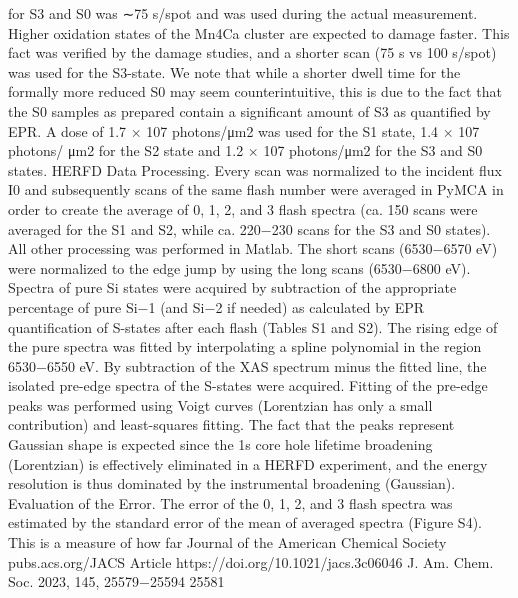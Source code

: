 \documentclass{article}
\begin{document}
for S3 and S0 was ∼75 s/spot and was used during the actual
measurement. Higher oxidation states of the Mn4Ca cluster are
expected to damage faster. This fact was verified by the damage
studies, and a shorter scan (75 s vs 100 s/spot) was used for
the S3-state. We note that while a shorter dwell time for the
formally more reduced S0 may seem counterintuitive, this is
due to the fact that the S0 samples as prepared contain a
significant amount of S3 as quantified by EPR. A dose of 1.7 ×
107 photons/μm2 was used for the S1 state, 1.4 × 107 photons/
μm2 for the S2 state and 1.2 × 107 photons/μm2 for the S3 and
S0 states.
HERFD Data Processing. Every scan was normalized to
the incident flux I0 and subsequently scans of the same flash
number were averaged in PyMCA in order to create the
average of 0, 1, 2, and 3 flash spectra (ca. 150 scans were
averaged for the S1 and S2, while ca. 220−230 scans for the S3
and S0 states). All other processing was performed in Matlab.
The short scans (6530−6570 eV) were normalized to the edge
jump by using the long scans (6530−6800 eV). Spectra of pure
Si states were acquired by subtraction of the appropriate
percentage of pure Si−1 (and Si−2 if needed) as calculated by
EPR quantification of S-states after each flash (Tables S1 and
S2). The rising edge of the pure spectra was fitted by
interpolating a spline polynomial in the region 6530−6550 eV.
By subtraction of the XAS spectrum minus the fitted line, the
isolated pre-edge spectra of the S-states were acquired. Fitting
of the pre-edge peaks was performed using Voigt curves
(Lorentzian has only a small contribution) and least-squares
fitting. The fact that the peaks represent Gaussian shape is
expected since the 1s core hole lifetime broadening
(Lorentzian) is effectively eliminated in a HERFD experiment,
and the energy resolution is thus dominated by the
instrumental broadening (Gaussian).
Evaluation of the Error. The error of the 0, 1, 2, and 3
flash spectra was estimated by the standard error of the mean
of averaged spectra (Figure S4). This is a measure of how far
Journal of the American Chemical Society
pubs.acs.org/JACS
Article
https://doi.org/10.1021/jacs.3c06046
J. Am. Chem. Soc. 2023, 145, 25579−25594
25581

\newpage

\end{document}
